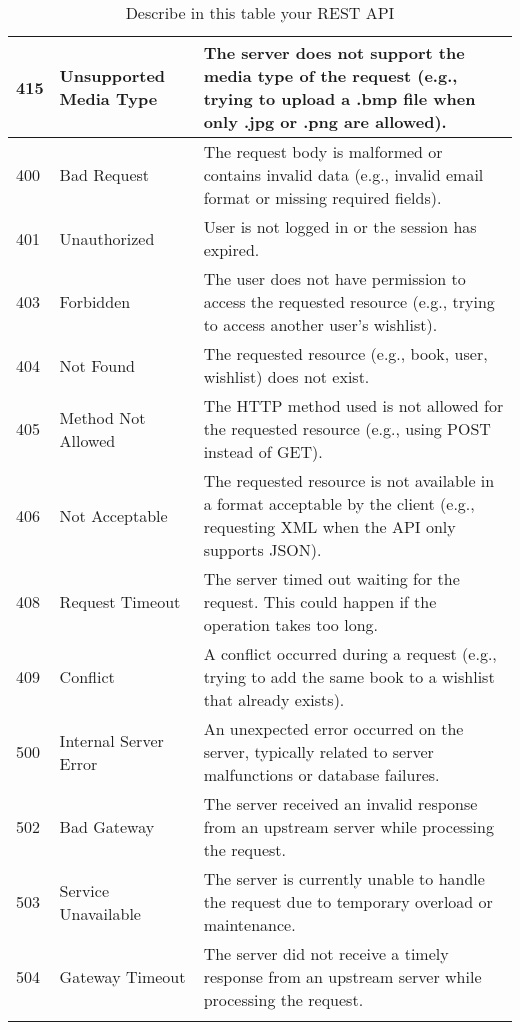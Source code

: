 \begin{longtable}{|p{}|p{} |p{}|}
\hline
415 & Unsupported Media Type & The server does not support the media type of the request (e.g., trying to upload a .bmp file when only .jpg or .png are allowed). \\
\hline
400 & Bad Request & The request body is malformed or contains invalid data (e.g., invalid email format or missing required fields). \\
\hline
401 & Unauthorized & User is not logged in or the session has expired. \\
\hline
403 & Forbidden & The user does not have permission to access the requested resource (e.g., trying to access another user's wishlist). \\
\hline
404 & Not Found & The requested resource (e.g., book, user, wishlist) does not exist. \\
\hline
405 & Method Not Allowed & The HTTP method used is not allowed for the requested resource (e.g., using POST instead of GET). \\
\hline
406 & Not Acceptable & The requested resource is not available in a format acceptable by the client (e.g., requesting XML when the API only supports JSON). \\
\hline
408 & Request Timeout & The server timed out waiting for the request. This could happen if the operation takes too long. \\
\hline
409 & Conflict & A conflict occurred during a request (e.g., trying to add the same book to a wishlist that already exists). \\
\hline
500 & Internal Server Error & An unexpected error occurred on the server, typically related to server malfunctions or database failures. \\
\hline
502 & Bad Gateway & The server received an invalid response from an upstream server while processing the request. \\
\hline
503 & Service Unavailable & The server is currently unable to handle the request due to temporary overload or maintenance. \\
\hline
504 & Gateway Timeout & The server did not receive a timely response from an upstream server while processing the request.
\\\hline
\caption{Describe in this table your REST API}
\label{tab:termGlossary}
\end{longtable}